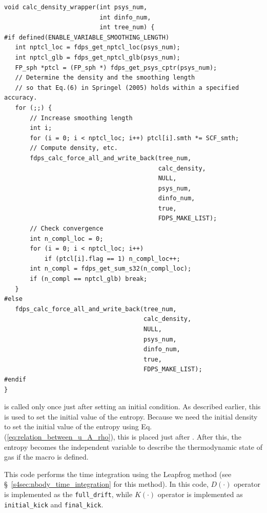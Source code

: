 \begin{lstlisting}[caption=Function \texttt{calc\_density\_wrapper}]
void calc_density_wrapper(int psys_num,
                          int dinfo_num,
                          int tree_num) {
#if defined(ENABLE_VARIABLE_SMOOTHING_LENGTH)
   int nptcl_loc = fdps_get_nptcl_loc(psys_num);
   int nptcl_glb = fdps_get_nptcl_glb(psys_num);
   FP_sph *ptcl = (FP_sph *) fdps_get_psys_cptr(psys_num);
   // Determine the density and the smoothing length
   // so that Eq.(6) in Springel (2005) holds within a specified accuracy.
   for (;;) {
       // Increase smoothing length 
       int i;
       for (i = 0; i < nptcl_loc; i++) ptcl[i].smth *= SCF_smth;
       // Compute density, etc.
       fdps_calc_force_all_and_write_back(tree_num,
                                          calc_density,
                                          NULL,
                                          psys_num,
                                          dinfo_num,
                                          true,
                                          FDPS_MAKE_LIST);
       // Check convergence
       int n_compl_loc = 0;
       for (i = 0; i < nptcl_loc; i++)
           if (ptcl[i].flag == 1) n_compl_loc++;
       int n_compl = fdps_get_sum_s32(n_compl_loc);
       if (n_compl == nptcl_glb) break;
   }
#else
   fdps_calc_force_all_and_write_back(tree_num,
                                      calc_density,
                                      NULL,
                                      psys_num,
                                      dinfo_num,
                                      true,
                                      FDPS_MAKE_LIST);
#endif
}
\end{lstlisting}
\endifC


\procedure {} is called only once just after setting an initial condition. As described earlier, this \procedure is used to set the initial value of the entropy. Because we need the initial density to set the initial value of the entropy using Eq. (\ref{eq:relation_between_u_A_rho}), this \procedure is placed just after \procedure  {}. After this, the entropy becomes the independent variable to describe the thermodynamic state of gas if the macro  is defined.


This code performs the time integration using the Leapfrog method (see \S~\ref{s4sec:nbody_time_integration} for this method). In this code, $D(\cdot)$ operator is implemented as the \procedure \texttt{full\_drift}, while $K(\cdot)$ operator is implemented as \procedures \texttt{initial\_kick} and \texttt{final\_kick}.

